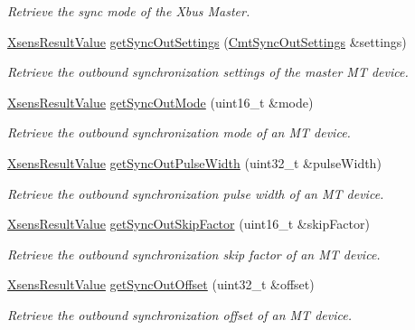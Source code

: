 \begin{DoxyCompactItemize}
\begin{DoxyCompactList}\small\item\em \-Retrieve the sync mode of the \-Xbus \-Master. \end{DoxyCompactList}\item 
\hyperlink{group__enums_ga822a2260a20af524029eef9e9a51ff6f}{\-Xsens\-Result\-Value} \hyperlink{classxsens_1_1Cmt3_a734c0357cfecb10642412fcff7857827}{get\-Sync\-Out\-Settings} (\hyperlink{structCmtSyncOutSettings}{\-Cmt\-Sync\-Out\-Settings} \&settings)
\begin{DoxyCompactList}\small\item\em \-Retrieve the outbound synchronization settings of the master \-M\-T device. \end{DoxyCompactList}\item 
\hyperlink{group__enums_ga822a2260a20af524029eef9e9a51ff6f}{\-Xsens\-Result\-Value} \hyperlink{classxsens_1_1Cmt3_ae2821fc9efa2bb83fff711460758b128}{get\-Sync\-Out\-Mode} (uint16\-\_\-t \&mode)
\begin{DoxyCompactList}\small\item\em \-Retrieve the outbound synchronization mode of an \-M\-T device. \end{DoxyCompactList}\item 
\hyperlink{group__enums_ga822a2260a20af524029eef9e9a51ff6f}{\-Xsens\-Result\-Value} \hyperlink{classxsens_1_1Cmt3_a4de8b49b49fe3af9198157d5fa692a83}{get\-Sync\-Out\-Pulse\-Width} (uint32\-\_\-t \&pulse\-Width)
\begin{DoxyCompactList}\small\item\em \-Retrieve the outbound synchronization pulse width of an \-M\-T device. \end{DoxyCompactList}\item 
\hyperlink{group__enums_ga822a2260a20af524029eef9e9a51ff6f}{\-Xsens\-Result\-Value} \hyperlink{classxsens_1_1Cmt3_aacc995fb458b67c2cd53aadf71904930}{get\-Sync\-Out\-Skip\-Factor} (uint16\-\_\-t \&skip\-Factor)
\begin{DoxyCompactList}\small\item\em \-Retrieve the outbound synchronization skip factor of an \-M\-T device. \end{DoxyCompactList}\item 
\hyperlink{group__enums_ga822a2260a20af524029eef9e9a51ff6f}{\-Xsens\-Result\-Value} \hyperlink{classxsens_1_1Cmt3_a52c9746b9546414d03a5f8f569d31dc5}{get\-Sync\-Out\-Offset} (uint32\-\_\-t \&offset)
\begin{DoxyCompactList}\small\item\em \-Retrieve the outbound synchronization offset of an \-M\-T device. \end{DoxyCompactList}\item 

\end{DoxyCompactItemize}
